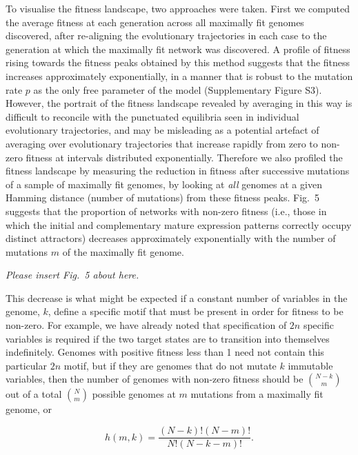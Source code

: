 \documentclass[10pt,letterpaper]{article}
\begin{document}
To visualise the fitness landscape, two approaches were taken. First we computed the average fitness at each generation across all maximally fit genomes discovered, after re-aligning the evolutionary trajectories in each case to the generation at which the maximally fit network was discovered. A profile of fitness rising towards the fitness peaks obtained by this method suggests that the fitness increases approximately exponentially, in a manner that is robust to the mutation rate $p$ as the only free parameter of the model (Supplementary Figure S3). However, the portrait of the fitness landscape revealed by averaging in this way is difficult to reconcile with the punctuated equilibria seen in individual evolutionary trajectories, and may be misleading as a potential artefact of averaging over evolutionary trajectories that increase rapidly from zero to non-zero fitness at intervals distributed exponentially. Therefore we also profiled the fitness landscape by measuring the reduction in fitness after successive mutations of a sample of maximally fit genomes, by looking at \emph{all} genomes at a given Hamming distance (number of mutations) from these fitness peaks. Fig.~5 suggests that the proportion of networks with non-zero fitness (i.e., those in which the initial and complementary mature expression patterns correctly occupy distinct attractors) decreases approximately exponentially with the number of mutations $m$ of the maximally fit genome.

\vspace{1em}\emph{\noindent Please insert Fig.~5 about here.}\vspace{1em}

This decrease is what might be expected if a constant number of variables in the genome, $k$, define a specific motif that must be present in order for fitness to be non-zero. For example, we have already noted that specification of $2n$ specific variables is required if the two target states are to transition into themselves indefinitely. Genomes with positive fitness less than 1 need not contain this particular $2n$ motif, but if they are genomes that do not mutate $k$ immutable variables, then the number of genomes with non-zero fitness should be ${{N-k}\choose{m}}$ out of a total ${{N}\choose{m}}$ possible genomes at $m$ mutations from a maximally fit genome, or

\begin{equation}
h(m,k)=\frac{(N-k)! (N-m)!}{N!(N-k-m)!}.
\end{equation}
\end{document}
